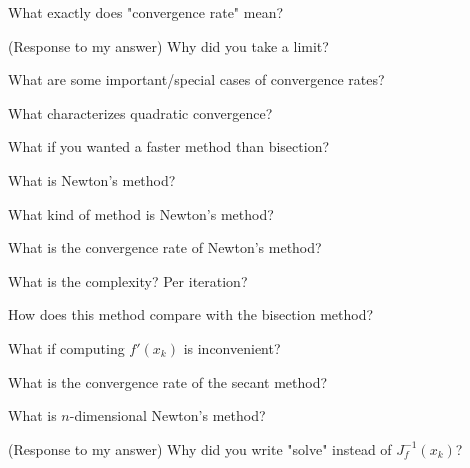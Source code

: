 \documentclass[12pt]{article}
\newenvironment{problem}[2][Problem]{\begin{trivlist}
\item[\hskip \labelsep {\bfseries #1}\hskip \labelsep {\bfseries #2.}]}{\end{trivlist}}
\begin{document}
\begin{problem}{}
What exactly does "convergence rate" mean?
\end{problem}

\begin{problem}{}
(Response to my answer)  Why did you take a limit?
\end{problem}

\begin{problem}{}
What are some important/special cases of convergence rates?
\end{problem}

\begin{problem}{}
What characterizes quadratic convergence?
\end{problem}

\begin{problem}{}
What if you wanted a faster method than bisection?
\end{problem}

\begin{problem}{}
What is Newton's method?
\end{problem}

\begin{problem}{}
What kind of method is Newton's method?
\end{problem}

\begin{problem}{}
What is the convergence rate of Newton's method?
\end{problem}

\begin{problem}{}
What is the complexity?  Per iteration?
\end{problem}

\begin{problem}{}
How does this method compare with the bisection method?
\end{problem}

\begin{problem}{}
What if computing $f'(x_k)$ is inconvenient?
\end{problem}

\begin{problem}{}
What is the convergence rate of the secant method?
\end{problem}

\begin{problem}{}
What is $n$-dimensional Newton's method?
\end{problem}

\begin{problem}{}
(Response to my answer)  Why did you write "solve" instead of $J_f^{-1}(x_k)$?
\end{problem}
\end{document}
